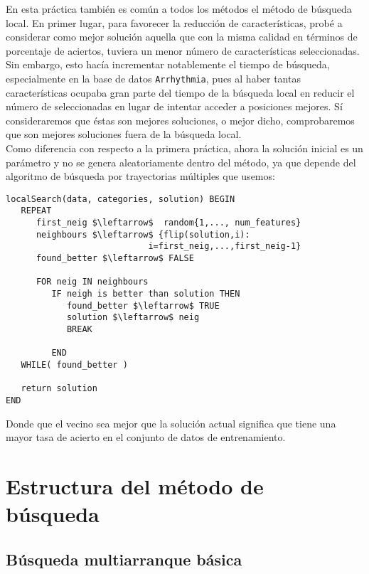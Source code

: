 \documentclass[11pt,leqno]{article}
\begin{document}
	
En esta práctica también es común a todos los métodos el método de búsqueda local. En primer lugar, para favorecer la reducción de características, probé a considerar como mejor solución aquella que con la misma calidad en términos de porcentaje de aciertos, tuviera un menor número de características seleccionadas. Sin embargo, esto hacía incrementar notablemente el tiempo de búsqueda, especialmente en la base de datos \texttt{Arrhythmia}, pues al haber tantas características ocupaba gran parte del tiempo de la búsqueda local en reducir el número de seleccionadas en lugar de intentar acceder a posiciones mejores. Sí consideraremos que éstas son mejores soluciones, o mejor dicho, comprobaremos que son mejores soluciones fuera de la búsqueda local.\\
Como diferencia con respecto a la primera práctica, ahora la solución inicial es un parámetro y no se genera aleatoriamente dentro del método, ya que depende del algoritmo de búsqueda por trayectorias múltiples que usemos:

	\begin{lstlisting}[mathescape=true]
localSearch(data, categories, solution) BEGIN	
   REPEAT
      first_neig $\leftarrow$  random{1,..., num_features}
      neighbours $\leftarrow$ {flip(solution,i): 
                            i=first_neig,...,first_neig-1}
      found_better $\leftarrow$ FALSE
		
      FOR neig IN neighbours
         IF neigh is better than solution THEN
            found_better $\leftarrow$ TRUE
            solution $\leftarrow$ neig
            BREAK
		
         END
   WHILE( found_better )
	
   return solution
END
	\end{lstlisting}
	
	Donde que el vecino sea mejor que la solución actual significa que tiene una mayor tasa de acierto en el conjunto de datos de entrenamiento.

\section{Estructura del método de búsqueda}

\subsection{Búsqueda multiarranque básica}
\end{document}
